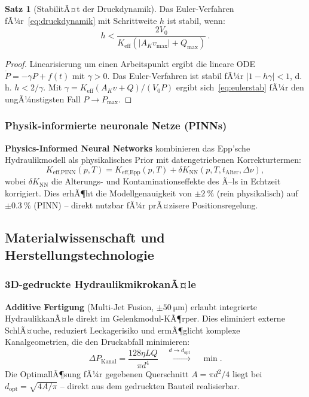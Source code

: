 ﻿\documentclass[a4paper,12pt]{scrreprt}
\theoremstyle{definition}
\newtheorem{satz}{Satz}[section]
\begin{document}
\begin{satz}[StabilitÃ¤t der Druckdynamik]
\label{satz:druckstabil}
Das Euler-Verfahren fÃ¼r~\eqref{eq:druckdynamik} mit Schrittweite
$h$ ist stabil, wenn:
\begin{equation}
  h < \frac{2 V_0}{K_{\text{eff}} (|A_K v_{\max}| + Q_{\max})}\,.
  \label{eq:eulerstab}
\end{equation}
\end{satz}

\begin{proof}
Linearisierung um einen Arbeitspunkt ergibt die lineare ODE
$\dot{P} = -\gamma P + f(t)$ mit $\gamma > 0$.
Das Euler-Verfahren ist stabil fÃ¼r $|1 - h\gamma| < 1$,
d.\,h. $h < 2/\gamma$.
Mit $\gamma = K_{\text{eff}} (A_K v + Q)/(V_0 P)$ ergibt
sich~\eqref{eq:eulerstab} fÃ¼r den ungÃ¼nstigsten Fall $P \to P_{\max}$.
\end{proof}

\subsubsection{Physik-informierte neuronale Netze (PINNs)}

\textbf{Physics-Informed Neural Networks} kombinieren das
Epp'sche Hydraulikmodell als physikalisches Prior mit
datengetriebenen Korrekturtermen:
\begin{equation}
  K_{\text{eff,PINN}}(p,T) = K_{\text{eff,Epp}}(p,T)
    + \delta K_{\text{NN}}(p,T,t_{\text{Alter}},\Delta\nu),
\end{equation}
wobei $\delta K_{\text{NN}}$ die Alterungs- und Kontaminationseffekte
des Ã–ls in Echtzeit korrigiert. Dies erhÃ¶ht die Modellgenauigkeit
von $\pm\SI{2}{\percent}$ (rein physikalisch) auf $\pm\SI{0.3}{\percent}$
(PINN) -- direkt nutzbar fÃ¼r prÃ¤zisere Positionsregelung.

\subsection{Materialwissenschaft und Herstellungstechnologie}

\subsubsection{3D-gedruckte HydraulikmikrokanÃ¤le}

\textbf{Additive Fertigung} (Multi-Jet Fusion, $\pm\SI{50}{\micro\meter}$)
erlaubt integrierte HydraulikkanÃ¤le direkt im Gelenkmodul-KÃ¶rper.
Dies eliminiert externe SchlÃ¤uche, reduziert Leckagerisiko und
ermÃ¶glicht komplexe Kanalgeometrien, die den Druckabfall minimieren:
\begin{equation}
  \Delta P_{\text{Kanal}} = \frac{128 \eta L Q}{\pi d^4}
  \quad \xrightarrow{d \to d_{\text{opt}}} \quad \min.
\end{equation}
Die OptimallÃ¶sung fÃ¼r gegebenen Querschnitt $A = \pi d^2/4$
liegt bei $d_{\text{opt}} = \sqrt{4A/\pi}$ -- direkt aus dem
gedruckten Bauteil realisierbar.
\end{document}
